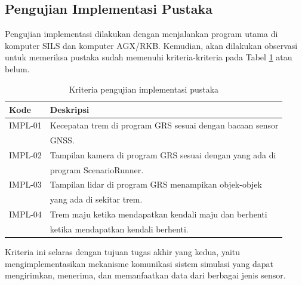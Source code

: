 \subsection{Pengujian Implementasi Pustaka}

Pengujian implementasi dilakukan dengan menjalankan program utama di komputer
SILS dan komputer AGX/RKB. Kemudian, akan dilakukan observasi untuk memeriksa
pustaka sudah memenuhi kriteria-kriteria pada Tabel
\ref{chapter-4-tbl-impl-criteria} atau belum.

\begin{table}[!htbp]
	\begin{center}
		\begin{tabular}{|l|l|}
			\hline
			\textbf{Kode} & \textbf{Deskripsi}                                     \\
			\hline
			IMPL-01       & Kecepatan trem di program GRS sesuai dengan bacaan
			sensor                                                                 \\
			              & GNSS.                                                  \\
			\hline
			IMPL-02       & Tampilan kamera di program GRS sesuai dengan yang
			ada di                                                                 \\
			              & program ScenarioRunner.                                \\
			\hline
			IMPL-03       & Tampilan lidar di program GRS menampikan
			objek-objek                                                            \\
			              & yang ada di sekitar trem.                              \\
			\hline
			IMPL-04       & Trem maju ketika mendapatkan kendali maju dan berhenti \\
			              & ketika mendapatkan kendali berhenti.                   \\
			\hline
		\end{tabular}
	\end{center}

	\caption{Kriteria pengujian implementasi pustaka}
	\label{chapter-4-tbl-impl-criteria}
\end{table}

Kriteria ini selaras dengan tujuan tugas akhir yang kedua, yaitu
mengimplementasikan mekanisme komunikasi sistem simulasi yang dapat mengirimkan,
menerima, dan memanfaatkan data dari berbagai jenis sensor.

